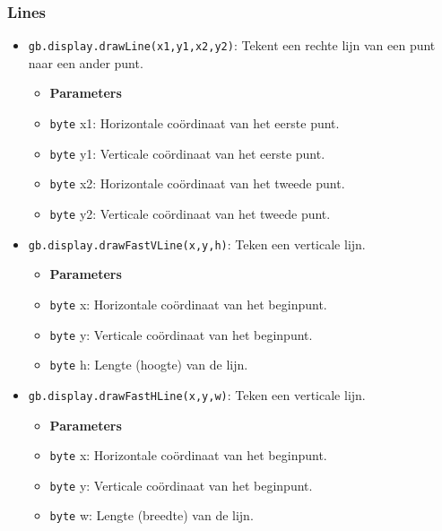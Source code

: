 \documentclass[a4paper,titlepage,12pt]{article}
\begin{document}
	\subsubsection{Lines}
	\begin{itemize}
		\item \texttt{gb.display.drawLine(x1,y1,x2,y2)}: Tekent een rechte lijn van een punt naar een ander punt.
		\begin{itemize}
			\item [] \textbf{Parameters}
			\item \texttt{byte} x1: Horizontale coördinaat van het eerste punt.
			\item \texttt{byte} y1: Verticale coördinaat van het eerste punt.
			\item \texttt{byte} x2: Horizontale coördinaat van het tweede punt.
			\item \texttt{byte} y2: Verticale coördinaat van het tweede punt.
		\end{itemize}
	
		\item \texttt{gb.display.drawFastVLine(x,y,h)}: Teken een verticale lijn.
		\begin{itemize}
			\item [] \textbf{Parameters}
			\item \texttt{byte} x: Horizontale coördinaat van het beginpunt.
			\item \texttt{byte} y: Verticale coördinaat van het beginpunt.
			\item \texttt{byte} h: Lengte (hoogte) van de lijn.
		\end{itemize}
	
		\item \texttt{gb.display.drawFastHLine(x,y,w)}: Teken een verticale lijn.
		\begin{itemize}
			\item [] \textbf{Parameters}
			\item \texttt{byte} x: Horizontale coördinaat van het beginpunt.
			\item \texttt{byte} y: Verticale coördinaat van het beginpunt.
			\item \texttt{byte} w: Lengte (breedte) van de lijn.
		\end{itemize}
	\end{itemize}
\end{document}
